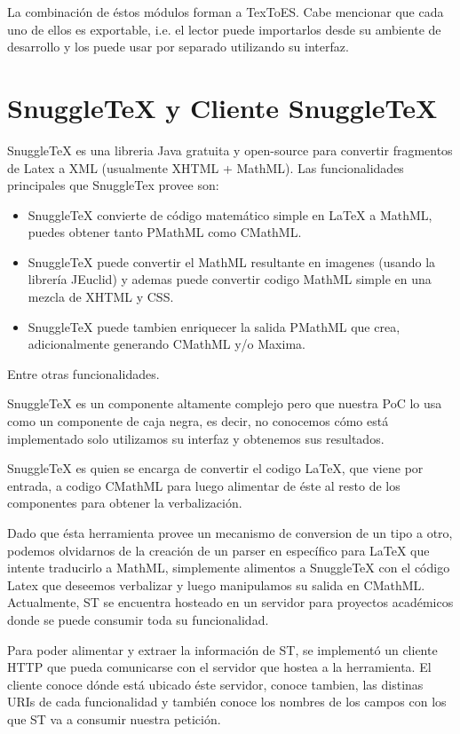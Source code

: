 La combinación de éstos módulos forman a TexToES. Cabe mencionar que cada uno de ellos es exportable, i.e. el lector puede importarlos desde su ambiente de desarrollo y los puede usar por separado utilizando su interfaz.

\section{SnuggleTeX y Cliente SnuggleTeX}

SnuggleTeX  es una libreria Java gratuita y open-source para convertir fragmentos de Latex a XML (usualmente XHTML + MathML). Las funcionalidades principales que SnuggleTex provee son:

\begin{itemize}
\item SnuggleTeX convierte de código matemático simple en LaTeX a MathML, puedes obtener tanto PMathML como CMathML.
\item SnuggleTeX puede convertir el MathML resultante en imagenes (usando la librería JEuclid) y ademas puede convertir codigo MathML simple en una mezcla de XHTML y CSS.
\item SnuggleTeX puede tambien enriquecer la salida PMathML que crea, adicionalmente generando CMathML y/o Maxima.
\end{itemize}

Entre otras funcionalidades.

SnuggleTeX es un componente altamente complejo pero que nuestra PoC lo usa como un componente de caja negra, es decir, no conocemos cómo está implementado solo utilizamos su interfaz y obtenemos sus resultados.

SnuggleTeX es quien se encarga de convertir el codigo LaTeX, que viene por entrada, a codigo CMathML para luego alimentar de éste al resto de los componentes para obtener la verbalización.

Dado que ésta herramienta provee un mecanismo de conversion de un tipo a otro, podemos olvidarnos de la creación de un parser en específico para LaTeX que intente traducirlo a MathML, simplemente alimentos a SnuggleTeX con el código Latex que deseemos verbalizar y luego manipulamos su salida en CMathML. Actualmente, ST se encuentra hosteado en un servidor para proyectos académicos donde se puede consumir toda su funcionalidad.

Para poder alimentar y extraer la información de ST, se implementó un cliente HTTP que pueda comunicarse con el servidor que hostea a la herramienta. El cliente conoce dónde está ubicado éste servidor, conoce tambien, las distinas URIs de cada funcionalidad y también conoce los nombres de los campos con los que ST va a consumir nuestra petición.

